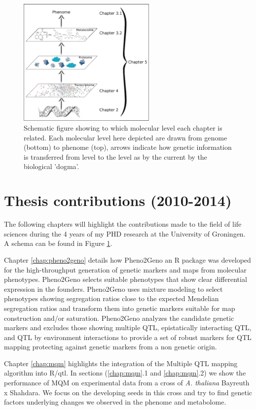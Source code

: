 \begin{figure}[h!]
 \centering
    \includegraphics[width=0.6\textwidth]{eps/image_1_3}
  \caption[ThesisLayout.]
    {Schematic figure showing to which molecular level each chapter is related. Each molecular 
    level here depicted are drawn from genome (bottom) to phenome (top), arrows indicate 
    how genetic information is transferred from level to the level as by the current by 
    the biological 'dogma'.}
    \label{fig:layout}
\end{figure}

\section{Thesis contributions (2010-2014)}
The following chapters will highlight the contributions made to the field of life 
sciences during the 4 years of my PHD research at the University of Groningen. A schema 
can be found in Figure \ref{fig:layout}.

Chapter \ref{chap:pheno2geno} details how Pheno2Geno an R package was developed for 
the high-throughput generation of genetic markers and maps from molecular phenotypes. 
Pheno2Geno selects suitable phenotypes that show clear differential expression in the founders. Pheno2Geno 
uses mixture modeling to select phenotypes showing segregation ratios close to the 
expected Mendelian segregation ratios and transform them into genetic markers suitable 
for map construction and/or saturation. Pheno2Geno analyzes the candidate genetic 
markers and excludes those showing multiple QTL, epistatically interacting QTL, and QTL 
by environment interactions to provide a set of robust markers for QTL mapping protecting 
against genetic markers from a non genetic origin.

Chapter \ref{chap:mqm} highlights the integration of the Multiple QTL mapping algorithm 
into R/qtl. In sections (\ref{chap:mqm}.1 and  \ref{chap:mqm}.2) we show the performance 
of MQM on experimental data from a cross of \emph{A. thaliana} Bayreuth x Shahdara. We 
focus on the developing seeds in this cross and try to find genetic factors underlying 
changes we observed in the phenome and metabolome.

